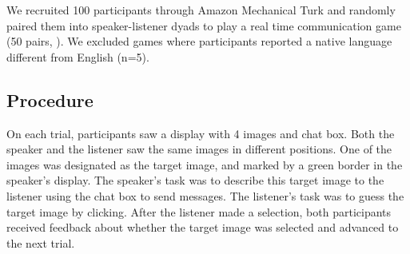 \documentclass[12pt,letterpaper]{article}
\begin{document}
We recruited 100 participants through Amazon Mechanical Turk and randomly paired them into speaker-listener dyads to play a real time communication game (50 pairs, \citealt{Hawkins2015}). We excluded games where participants reported a native language different from English (n=5).

\subsection{Procedure} 

On each trial, participants saw a display with 4 images and chat box. Both the speaker and the listener saw the same images in different positions. One of the images was designated as the target image, and marked by a green border in the speaker's display. The speaker's task was to describe this target image to the listener using the chat box to send messages. The listener's task was to guess the target image by clicking. After the listener made a selection, both participants received feedback about whether the target image was selected and advanced to the next trial. 
\end{document}
